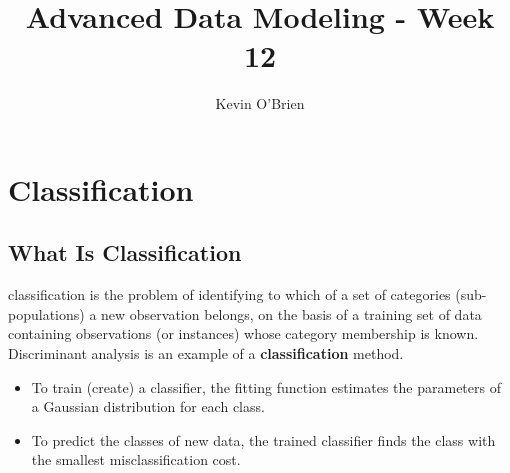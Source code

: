 \documentclass[12pt]{article} %
\title{Advanced Data Modeling - Week 12}
\author{Kevin O'Brien}
\begin{document}
\maketitle
\tableofcontents
\newpage
\section{Classification}
\subsection{What Is Classification}
classification is the problem of identifying to which of a set of categories (sub-populations) a new observation belongs, on the basis of a training set of data containing observations (or instances) whose category membership is known.
Discriminant analysis is an example of a \textbf{classification} method.


\begin{itemize}
\item To train (create) a classifier, the fitting function estimates the parameters of a Gaussian distribution for each class.
\item To predict the classes of new data, the trained classifier finds the class with the smallest misclassification cost.
\end{itemize}
%
\end{document}
